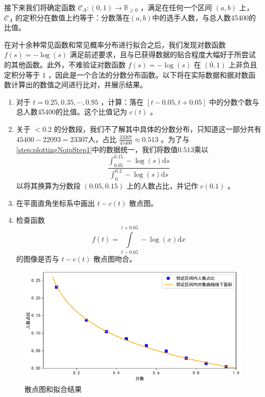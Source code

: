         接下来我们将确定函数 $\mathcal{C}_A:\left(0,1\right)\to\mathbb{R}_{\geq 0}$ ，满足在任何一个区间 $\left(a,b\right)$ 上，$\mathcal{C}_A$ 的定积分在数值上约等于：分数落在$\left(a,b\right)$中的选手人数，与总人数45400的比值。
        
        在对十余种常见函数和常见概率分布进行拟合之后，我们发现对数函数 $f(s)=-\log(s)$ 满足前述要求，且与已获得数据的贴合程度大幅好于所尝试的其他函数。此外，不难验证对数函数 $f(s)=-\log(s)$ 在 $(0,1)$ 上非负且定积分等于 $1$ ，因此是一个合法的分数分布函数。以下将在实际数据和据对数函数计算出的数值之间进行比对，并展示结果。

        \begin{enumerate}[leftmargin=6em,label=\textbf{步骤 \arabic*.},ref=步骤 \arabic*.]
            \item \label{step:plottingNoipStep1} 对于 $t=0.25,0.35,\cdots,0.95$ ，计算：落在 $\left[t-0.05,t+0.05\right]$ 中的分数个数与总人数45400的比值。这个比值记为 $c(t)$ 。
            \item 关于 $<0.2$ 的分数段，我们不了解其中具体的分数分布，只知道这一部分共有$45400-22093=23307$人，占比 $\frac{23307}{45400}\approx 0.513$ 。为了与\ref{step:plottingNoipStep1}中的数据统一，我们将数值$0.513$乘以$$\frac{\int_{0.05}^{0.15}-\log(s)\mathrm{d}s}{\int_{0}^{0.2}-\log(s)\mathrm{d}s}$$以将其换算为分数段 $(0.05,0.15)$ 上的人数占比，并记作 $c(0.1)$ 。
            \item 在平面直角坐标系中画出 $t-c(t)$ 散点图。
            \item 检查函数 $$f(t)=\int\limits_{t-0.05}^{t+0.05}-\log(x)\mathrm{d}x$$ 的图像是否与 $t-c(t)$ 散点图吻合。
        \end{enumerate}

        \begin{figure}[htbp]
            \centering
            \includegraphics[width=\textwidth]{fig/fittingNoipScores.pdf}
            \caption{散点图和拟合结果}
            \label{fig:fittingNoipScoresByLogCurve}
        \end{figure}

